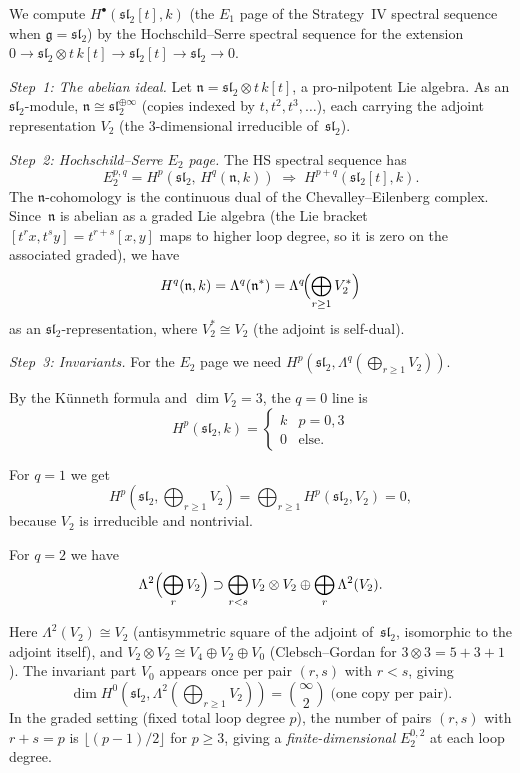 \begin{computation}
\label{comp:current-algebra-E1}
We compute $H^\bullet(\mathfrak{sl}_2[t], k)$ (the $E_1$
page of the Strategy~IV spectral sequence when
$\mathfrak{g} = \mathfrak{sl}_2$) by the Hochschild--Serre
spectral sequence for the extension
$0 \to \mathfrak{sl}_2 \otimes t\,k[t] \to \mathfrak{sl}_2[t]
\to \mathfrak{sl}_2 \to 0$.

\emph{Step~1: The abelian ideal.}
Let $\mathfrak{n} = \mathfrak{sl}_2 \otimes t\,k[t]$, a
pro-nilpotent Lie algebra. As an $\mathfrak{sl}_2$-module,
$\mathfrak{n} \cong \mathfrak{sl}_2^{\oplus \infty}$
(copies indexed by $t, t^2, t^3, \ldots$), each carrying the
adjoint representation $V_2$ (the $3$-dimensional irreducible
of~$\mathfrak{sl}_2$).

\emph{Step~2: Hochschild--Serre $E_2$ page.}
The HS spectral sequence has
\[
E_2^{p,q} = H^p(\mathfrak{sl}_2,\, H^q(\mathfrak{n}, k))
\;\Longrightarrow\; H^{p+q}(\mathfrak{sl}_2[t], k).
\]
The $\mathfrak{n}$-cohomology is the continuous dual of the
Chevalley--Eilenberg complex. Since~$\mathfrak{n}$ is
abelian as a graded Lie algebra (the Lie bracket
$[t^r x, t^s y] = t^{r+s}[x,y]$ maps to higher loop degree, so
it is zero on the associated graded), we have
\[
H^q(\mathfrak{n}, k) = \Lambda^q(\mathfrak{n}^*)
= \Lambda^q\!\Bigl(\bigoplus_{r \ge 1} V_2^*\Bigr)
\]
as an $\mathfrak{sl}_2$-representation, where
$V_2^* \cong V_2$ (the adjoint is self-dual).

\emph{Step~3: Invariants.}
For the $E_2$ page we need
$H^p(\mathfrak{sl}_2, \Lambda^q(\bigoplus_{r \ge 1} V_2))$.

By the K\"unneth formula and $\dim V_2 = 3$, the $q = 0$ line is
\[
H^p(\mathfrak{sl}_2, k)
= \begin{cases} k & p = 0, 3 \\ 0 & \text{else}. \end{cases}
\]

For $q = 1$ we get
\[
H^p(\mathfrak{sl}_2, \bigoplus_{r \ge 1} V_2)
= \bigoplus_{r \ge 1} H^p(\mathfrak{sl}_2, V_2)
= 0,
\]
because $V_2$ is irreducible and nontrivial.

For $q = 2$ we have
\[
\Lambda^2\Bigl(\bigoplus_r V_2\Bigr)
\supset
\bigoplus_{r < s} V_2 \otimes V_2
\oplus \bigoplus_r \Lambda^2(V_2).
\]

Here $\Lambda^2(V_2) \cong V_2$ (antisymmetric square of the
adjoint of~$\mathfrak{sl}_2$, isomorphic to the adjoint itself),
and $V_2 \otimes V_2 \cong V_4 \oplus V_2 \oplus V_0$
(Clebsch--Gordan for $3 \otimes 3 = 5 + 3 + 1$). The invariant
part $V_0$ appears once per pair $(r,s)$ with $r < s$, giving
\[
\dim H^0(\mathfrak{sl}_2, \Lambda^2(\textstyle\bigoplus_{r \ge 1}
V_2)) = \binom{\infty}{2} \;\text{(one copy per pair)}.
\]
In the graded setting (fixed total loop degree $p$), the number of
pairs $(r,s)$ with $r + s = p$ is $\lfloor (p-1)/2 \rfloor$ for
$p \ge 3$, giving a \emph{finite-dimensional} $E_2^{0,2}$
at each loop degree.


\end{computation}
